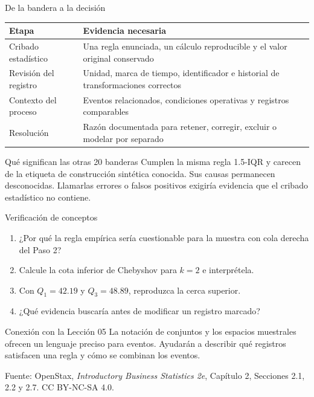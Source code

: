 \documentclass[aspectratio=169,10pt,spanish]{beamer}
\begin{document}
\begin{frame}{De la bandera a la decisión}
  \small
  \begin{center}
    \begin{tabular}{p{}p{}}
      \toprule
      \textbf{Etapa} & \textbf{Evidencia necesaria} \\
      \midrule
      Cribado estadístico & Una regla enunciada, un cálculo reproducible y el valor original conservado \\
      Revisión del registro & Unidad, marca de tiempo, identificador e historial de transformaciones correctos \\
      Contexto del proceso & Eventos relacionados, condiciones operativas y registros comparables \\
      Resolución & Razón documentada para retener, corregir, excluir o modelar por separado \\
      \bottomrule
    \end{tabular}
  \end{center}

  \vspace{0.8em}
  \begin{exampleblock}{Qué significan las otras 20 banderas}
    Cumplen la misma regla 1.5-IQR y carecen de la etiqueta de construcción
    sintética conocida. Sus causas permanecen desconocidas. Llamarlas
    errores o falsos positivos exigiría evidencia que el cribado
    estadístico no contiene.
  \end{exampleblock}
\end{frame}

\begin{frame}{Verificación de conceptos}
  \begin{enumerate}
    \item ¿Por qué la regla empírica sería cuestionable para la muestra con
      cola derecha del Paso 2?
    \item Calcule la cota inferior de Chebyshov para $k=2$ e interprétela.
    \item Con $Q_1=42.19$ y $Q_3=48.89$, reproduzca la cerca superior.
    \item ¿Qué evidencia buscaría antes de modificar un registro marcado?
  \end{enumerate}

  \vspace{0.5em}
  \begin{block}{Conexión con la Lección 05}
    La notación de conjuntos y los espacios muestrales ofrecen un lenguaje
    preciso para eventos. Ayudarán a describir qué registros satisfacen una
    regla y cómo se combinan los eventos.
  \end{block}

  \vfill
  \scriptsize Fuente: OpenStax, \textit{Introductory Business Statistics 2e},
  Capítulo 2, Secciones 2.1, 2.2 y 2.7. CC BY-NC-SA 4.0.
\end{frame}

\appendix
\end{document}
